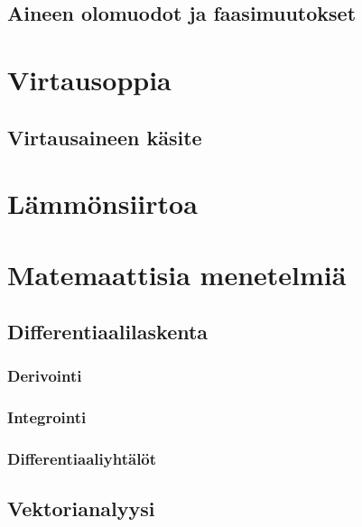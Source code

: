 \documentclass[12pt,a4paper,finnish]{book}
\begin{document}
\chapter{Aineen olomuodot ja faasimuutokset}

\part{Virtausoppia} %

\chapter{Virtausaineen käsite}

\part{Lämmönsiirtoa} %

\part{Matemaattisia menetelmiä} %

\chapter{Differentiaalilaskenta} %

\section{Derivointi}

\section{Integrointi}

\section{Differentiaaliyhtälöt}

\chapter{Vektorianalyysi} %
\end{document}

